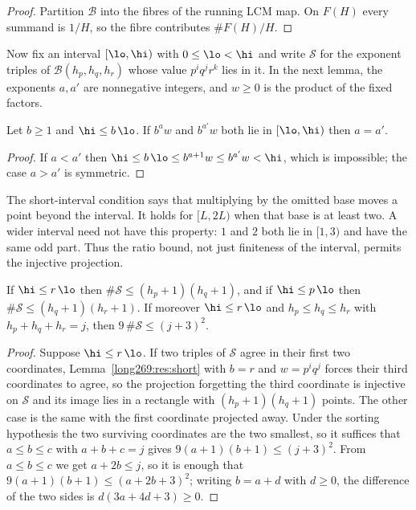 \begin{proof}
Partition $\mathcal B$ into the fibres of the running LCM map.  On $F(H)$ every
summand is $1/H$, so the fibre contributes $\#F(H)/H$.
\end{proof}


Now fix an interval $[\lo,\hi)$ with $0\le\lo<\hi$ and write
$\mathcal S$ for the exponent triples of $\mathcal B(h_p,h_q,h_r)$ whose
value $p^iq^jr^k$ lies in it.  In the next lemma, the exponents $a,a'$ are
nonnegative integers, and $w\ge0$ is the product of the fixed factors.

\begin{lemma}\label{long269:res:short}
Let $b\ge1$ and $\hi\le b\,\lo$.  If $b^{a}w$ and $b^{a'}w$ both lie in
$[\lo,\hi)$ then $a=a'$.
\end{lemma}

\begin{proof}
If $a<a'$ then $\hi\le b\,\lo\le b^{a+1}w\le b^{a'}w<\hi$, which is impossible;
the case $a>a'$ is symmetric.
\end{proof}

The short-interval condition says that multiplying by the omitted base
moves a point beyond the interval.  It holds for $[L,2L)$ when that base
is at least two.  A wider interval need not have this property: $1$ and
$2$ both lie in $[1,3)$ and have the same odd part.  Thus the ratio bound,
not just finiteness of the interval, permits the injective projection.

\begin{proposition}\label{long269:res:drop}
\label{long269:res:shell}
If $\hi\le r\,\lo$ then $\#\mathcal S\le(h_p+1)(h_q+1)$, and if
$\hi\le p\,\lo$ then $\#\mathcal S\le(h_q+1)(h_r+1)$.  If moreover
$\hi\le r\,\lo$ and $h_p\le h_q\le h_r$ with $h_p+h_q+h_r=j$, then
$9\,\#\mathcal S\le(j+3)^{2}$.
\end{proposition}

\begin{proof}
Suppose $\hi\le r\,\lo$.  If two triples of $\mathcal S$ agree in their first
two coordinates, Lemma~\ref{long269:res:short} with $b=r$ and $w=p^{i}q^{j}$ forces
their third coordinates to agree, so the projection forgetting the third
coordinate is injective on $\mathcal S$ and its image lies in a rectangle with
$(h_p+1)(h_q+1)$ points.  The other case is the same with the first coordinate
projected away.  Under the sorting hypothesis the two surviving coordinates are
the two smallest, so it suffices that $a\le b\le c$ with $a+b+c=j$ gives
$9(a+1)(b+1)\le(j+3)^{2}$.  From $a\le b\le c$ we get $a+2b\le j$, so it is
enough that $9(a+1)(b+1)\le(a+2b+3)^{2}$; writing $b=a+d$ with $d\ge0$, the
difference of the two sides is $d(3a+4d+3)\ge0$.
\end{proof}


